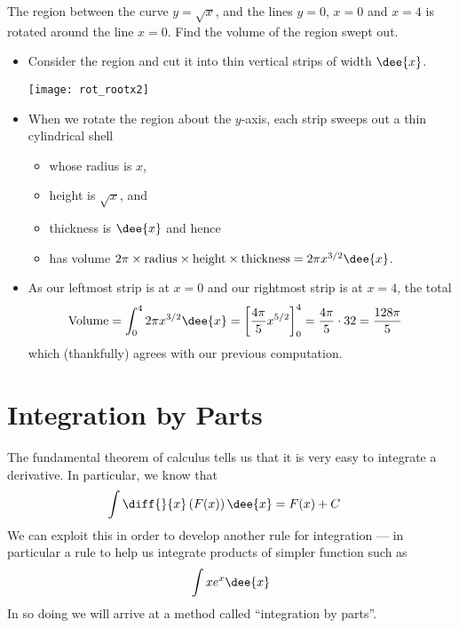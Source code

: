 \begin{eg}
The region between the curve $y=\sqrt{x}$, and the lines $y=0$, $x=0$ and $x=4$
is rotated around the line $x=0$. Find the volume of the region swept out.

\soln
\begin{itemize}
 \item Consider the region and cut it into thin vertical strips of width $\dee{x}$.
\begin{efig}
 \centering
\texttt{[image: rot\_rootx2]}
\end{efig}

\item When we rotate the region about the $y$-axis, each strip sweeps out a thin
cylindrical shell
\begin{itemize}
\item whose radius is $x$,
\item height is $\sqrt{x}$, and
\item thickness is $\dee{x}$ and hence
\item has volume $2 \pi \times \text{radius} \times \text{height} \times \text{thickness}
= 2 \pi x^{3/2} \dee{x}$.
\end{itemize}
\item As our leftmost strip is at $x=0$ and our rightmost strip is
at $x=4$, the total
\begin{align*}
\text{Volume}
&= \int _0^4 2\pi x^{3/2} \dee{x}
=\left[\frac{4\pi}{5} x^{5/2} \right]_0^4
= \frac{4\pi}{5}\cdot 32 = \frac{128\pi}{5}
\end{align*}
which (thankfully) agrees with our previous computation.

\end{itemize}
\end{eg}

\section{Integration by Parts}\label{sec intbyparts}
The fundamental theorem of calculus tells us that it is very easy to integrate a
derivative. In particular, we know that
\begin{align*}
  \int \diff{}{x}\left( F(x) \right) \dee{x} &= F(x)+C
\end{align*}
We can exploit this in order to develop another rule for integration --- in particular a
rule to help us integrate products of simpler function such as
\begin{align*}
  \int x e^x \dee{x}
\end{align*}
In so doing we will arrive at a method called ``integration by parts''.


